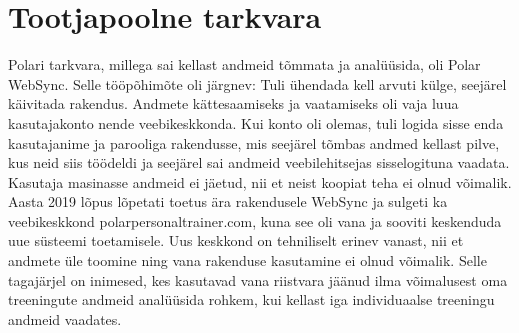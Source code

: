 
\section{Tootjapoolne tarkvara}\label{sec:tootja-soft}
Polari tarkvara, millega sai kellast andmeid tõmmata ja analüüsida, oli Polar WebSync.
Selle tööpõhimõte oli järgnev:
Tuli ühendada kell arvuti külge, seejärel käivitada rakendus.
Andmete kättesaamiseks ja vaatamiseks oli vaja luua kasutajakonto nende veebikeskkonda.
Kui konto oli olemas, tuli logida sisse enda kasutajanime ja parooliga rakendusse, mis seejärel tõmbas andmed kellast pilve, kus neid siis töödeldi ja seejärel sai andmeid veebilehitsejas sisselogituna vaadata. 
Kasutaja masinasse andmeid ei jäetud, nii et neist koopiat teha ei olnud võimalik.
Aasta 2019 lõpus\cite{polar-ws-discontinued} lõpetati toetus ära rakendusele WebSync ja sulgeti ka veebikeskkond polarpersonaltrainer.com, kuna see oli vana ja sooviti keskenduda uue süsteemi toetamisele.
Uus keskkond on tehniliselt erinev vanast, nii et andmete üle toomine ning vana rakenduse kasutamine ei olnud võimalik.
Selle tagajärjel on inimesed, kes kasutavad vana riistvara jäänud ilma võimalusest oma treeningute andmeid analüüsida rohkem, kui kellast iga individuaalse treeningu andmeid vaadates.

